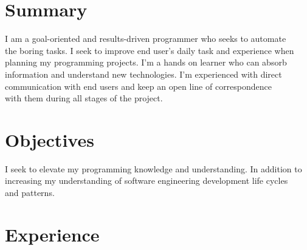 \documentclass[letterpaper]{twentysecondcv} %
\begin{document}
\makeprofile %

\section{Summary}
\begin{twenty}
	I am a goal-oriented and results-driven programmer who seeks to automate \\ the boring tasks. I seek to improve end user's daily task and experience when \\planning my programming projects. I'm a hands on learner who can absorb \\information  and understand new technologies. I'm experienced with direct \\communication with 
	end users and keep an open line of correspondence\\with them during all stages of the project. 
\end{twenty} 
\section{Objectives}
\begin{twenty}
	I seek to elevate my programming knowledge and understanding. In addition to \\increasing my understanding of software engineering development life cycles \\and patterns.
\end{twenty}
\section{Experience}
\end{document}
